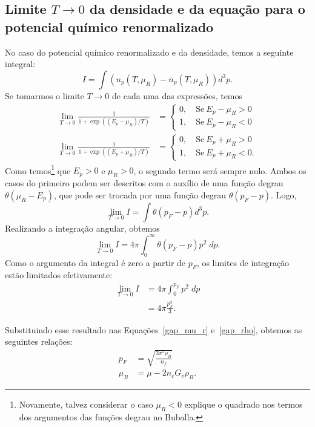 \subsection{Limite $T \to 0$ da densidade e da equação para o potencial químico renormalizado}

No caso do potencial químico renormalizado e da densidade, temos a seguinte integral:
\begin{equation}
	I = \int (n_p(T,\mu_R) - \bar{n}_p(T, \mu_R)) d^3p.
\end{equation}
%
Se tomarmos o limite $T \to 0$ de cada uma das expressões, temos
\begin{align}
	\lim_{T \to 0} \frac{1}{1+\exp((E_p - \mu_R)/T)} &= \begin{cases} 0, \quad \textrm{Se}~E_p - \mu_R > 0 \\ 1, \quad \textrm{Se}~E_p - \mu_R < 0 \end{cases} \\
	\lim_{T \to 0} \frac{1}{1+\exp((E_p + \mu_R)/T)} &= \begin{cases} 0, \quad \textrm{Se}~E_p + \mu_R > 0 \\ 1, \quad \textrm{Se}~E_p + \mu_R < 0. \end{cases}
\end{align}
%
Como temos\footnote{Novamente, talvez considerar o caso $\mu_R < 0$ explique o quadrado nos termos dos argumentos das funções degrau no Buballa.} que $E_p > 0$ e $\mu_R > 0$, o segundo termo será sempre nulo. Ambos os casos do primeiro podem ser descritos com o auxílio de uma função degrau $\theta(\mu_R - E_p)$, que pode ser trocada por uma função degrau $\theta(p_F - p)$. Logo,
\begin{equation}
	\lim_{T \to 0} I = \int \theta(p_F - p)d^3p.
\end{equation}
%
Realizando a integração angular, obtemos
\begin{equation}
	\lim_{T \to 0} I = 4\pi \int_0^\infty \theta(p_F - p) p^2 \;dp.
\end{equation}
%
Como o argumento da integral é zero a partir de $p_F$, os limites de integração estão limitados efetivamente:
\begin{align}
	\lim_{T \to 0} I &= 4\pi \int_0^{p_F} p^2 \;dp \\
	&= 4\pi \frac{p_F^3}{3}.
\end{align}

Substituindo esse resultado nas Equações~\eqref{gap_mu_r} e~\eqref{gap_rho}, obtemos as seguintes relações:
\begin{align}
	p_F &= \sqrt{\frac{3\pi^2\rho_B}{n_f}} \\
	\mu_R &= \mu - 2 n_c G_v \rho_B.
\end{align}	

